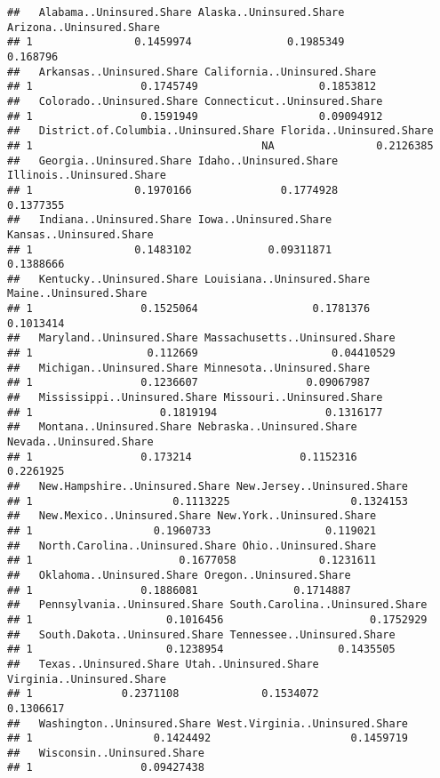 \documentclass[
]{article}
\begin{document}
\begin{verbatim}
##   Alabama..Uninsured.Share Alaska..Uninsured.Share Arizona..Uninsured.Share
## 1                0.1459974               0.1985349                 0.168796
##   Arkansas..Uninsured.Share California..Uninsured.Share
## 1                 0.1745749                   0.1853812
##   Colorado..Uninsured.Share Connecticut..Uninsured.Share
## 1                 0.1591949                   0.09094912
##   District.of.Columbia..Uninsured.Share Florida..Uninsured.Share
## 1                                    NA                0.2126385
##   Georgia..Uninsured.Share Idaho..Uninsured.Share Illinois..Uninsured.Share
## 1                0.1970166              0.1774928                 0.1377355
##   Indiana..Uninsured.Share Iowa..Uninsured.Share Kansas..Uninsured.Share
## 1                0.1483102            0.09311871               0.1388666
##   Kentucky..Uninsured.Share Louisiana..Uninsured.Share Maine..Uninsured.Share
## 1                 0.1525064                  0.1781376              0.1013414
##   Maryland..Uninsured.Share Massachusetts..Uninsured.Share
## 1                  0.112669                     0.04410529
##   Michigan..Uninsured.Share Minnesota..Uninsured.Share
## 1                 0.1236607                 0.09067987
##   Mississippi..Uninsured.Share Missouri..Uninsured.Share
## 1                    0.1819194                 0.1316177
##   Montana..Uninsured.Share Nebraska..Uninsured.Share Nevada..Uninsured.Share
## 1                 0.173214                 0.1152316               0.2261925
##   New.Hampshire..Uninsured.Share New.Jersey..Uninsured.Share
## 1                      0.1113225                   0.1324153
##   New.Mexico..Uninsured.Share New.York..Uninsured.Share
## 1                   0.1960733                  0.119021
##   North.Carolina..Uninsured.Share Ohio..Uninsured.Share
## 1                       0.1677058             0.1231611
##   Oklahoma..Uninsured.Share Oregon..Uninsured.Share
## 1                 0.1886081               0.1714887
##   Pennsylvania..Uninsured.Share South.Carolina..Uninsured.Share
## 1                     0.1016456                       0.1752929
##   South.Dakota..Uninsured.Share Tennessee..Uninsured.Share
## 1                     0.1238954                  0.1435505
##   Texas..Uninsured.Share Utah..Uninsured.Share Virginia..Uninsured.Share
## 1              0.2371108             0.1534072                 0.1306617
##   Washington..Uninsured.Share West.Virginia..Uninsured.Share
## 1                   0.1424492                      0.1459719
##   Wisconsin..Uninsured.Share
## 1                 0.09427438
\end{verbatim}
\end{document}
